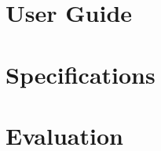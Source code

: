 \documentclass[a4paper]{report}
\begin{document}


\chapter{User Guide}


 






\chapter{Specifications}





\chapter{Evaluation}

\end{document}
